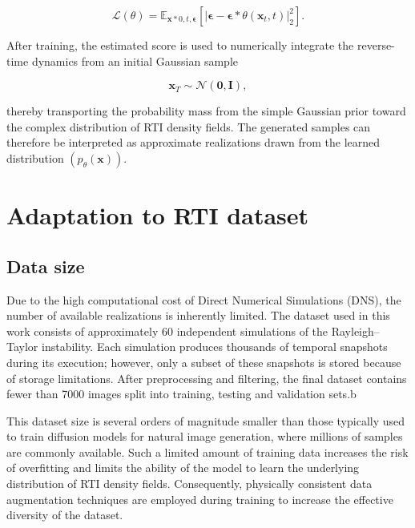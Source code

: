 \begin{equation}
\mathcal{L}(\theta)
=
\mathbb{E}_{\mathbf{x}*0,t,\boldsymbol{\epsilon}}
\left[
\left|
\boldsymbol{\epsilon}
-
\boldsymbol{\epsilon}*{\theta}
(\mathbf{x}_t,t)
\right|_2^2
\right].
\end{equation}

After training, the estimated score is used to numerically integrate the reverse-time dynamics from an initial Gaussian sample

\begin{equation}
\mathbf{x}_T
\sim
\mathcal{N}(\mathbf{0},\mathbf{I}),
\end{equation}

thereby transporting the probability mass from the simple Gaussian prior toward the complex distribution of RTI density fields. The generated samples can therefore be interpreted as approximate realizations drawn from the learned distribution $(p_{\theta}(\mathbf{x}))$.


\section{Adaptation to RTI dataset}

\subsection{Data size}

Due to the high computational cost of Direct Numerical Simulations (DNS), the
number of available realizations is inherently limited. The dataset used in
this work consists of approximately 60 independent simulations of the
Rayleigh--Taylor instability. Each simulation produces thousands of temporal
snapshots during its execution; however, only a subset of these snapshots is
stored because of storage limitations. After preprocessing and filtering, the
final dataset contains fewer than 7000 images split into training, testing and validation sets.b

This dataset size is several orders of magnitude smaller than those typically
used to train diffusion models for natural image generation, where millions of
samples are commonly available. Such a limited amount of training data
increases the risk of overfitting and limits the ability of the model to learn
the underlying distribution of RTI density fields. Consequently, physically
consistent data augmentation techniques are employed during training to increase
the effective diversity of the dataset.

